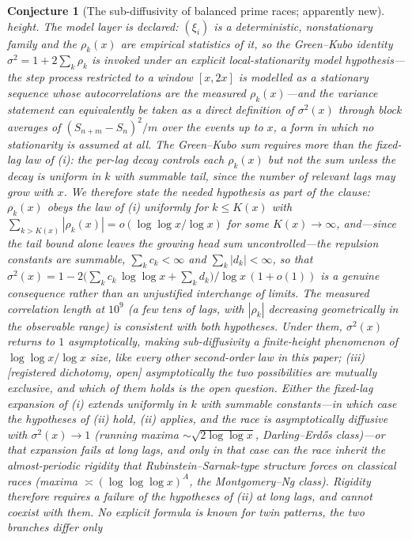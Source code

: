 \documentclass[11pt]{article}
\newtheorem{conjecture}{Conjecture}
\theoremstyle{definition}
\begin{document}
\begin{conjecture}[The sub-diffusivity of balanced prime races;
apparently new]
height.  The model layer is declared:
$(\xi_i)$ is a deterministic, nonstationary family and the
$\rho_k(x)$ are empirical statistics of it, so the Green--Kubo
identity $\sigma^2=1+2\sum_k\rho_k$ is invoked under an explicit
\emph{local-stationarity model hypothesis}---the step process
restricted to a window $[x,2x]$ is modelled as a stationary sequence
whose autocorrelations are the measured $\rho_k(x)$---and the
variance statement can equivalently be taken as a direct
\emph{definition} of $\sigma^2(x)$ through block averages of
$(S_{n+m}-S_n)^2/m$ over the events up to $x$, a form in which no
stationarity is assumed at all.  The Green--Kubo sum requires more than the
fixed-lag law
of (i): the
per-lag decay controls each $\rho_k(x)$ but not the sum unless the
decay is \emph{uniform in $k$ with summable tail}, since the number
of relevant lags may grow with $x$.  We therefore state the needed
hypothesis as part of the clause: $\rho_k(x)$ obeys the law of (i)
uniformly for $k\le K(x)$ with
$\sum_{k>K(x)}|\rho_k(x)|=o(\log\log x/\log x)$ for some
$K(x)\to\infty$, \emph{and}---since the tail bound alone leaves the
growing head sum uncontrolled---the
repulsion constants are summable, $\sum_k c_k<\infty$ and
$\sum_k|d_k|<\infty$, so that
$\sigma^2(x)=1-2\bigl(\textstyle\sum_kc_k\,\log\log
x+\sum_kd_k\bigr)/\log x\,(1+o(1))$ is a genuine consequence
rather than an unjustified interchange of limits.  The measured
correlation length at $10^9$ (a few tens of lags, with
$|\rho_k|$ decreasing geometrically in the observable range) is
consistent with both hypotheses.  Under them,
$\sigma^2(x)$ returns to $1$
asymptotically, making sub-diffusivity a finite-height phenomenon
of $\log\log x/\log x$ size, like every other second-order law in
this paper;
\emph{(iii)} [registered dichotomy, open] asymptotically the two
possibilities are \emph{mutually exclusive}, and which of them holds
is the open question.  Either the fixed-lag expansion of (i) extends
uniformly in $k$ with summable constants---in which case the
hypotheses of (ii) hold, (ii) applies, and the race is asymptotically
diffusive with $\sigma^2(x)\to1$ (running maxima
$\sim\sqrt{2\log\log x}$, Darling--Erd\H os class)---or that
expansion fails at long lags, and only in that case can the race
inherit the almost-periodic rigidity that Rubinstein--Sarnak-type
structure \cite{RubinsteinSarnak} forces on classical races (maxima
$\asymp(\log\log\log x)^{A}$, the Montgomery--Ng class).  Rigidity
therefore requires a failure of the hypotheses of (ii) at long lags,
and cannot coexist with them.  No explicit
formula is known for twin patterns, the two branches differ only

\end{conjecture}
\end{document}

